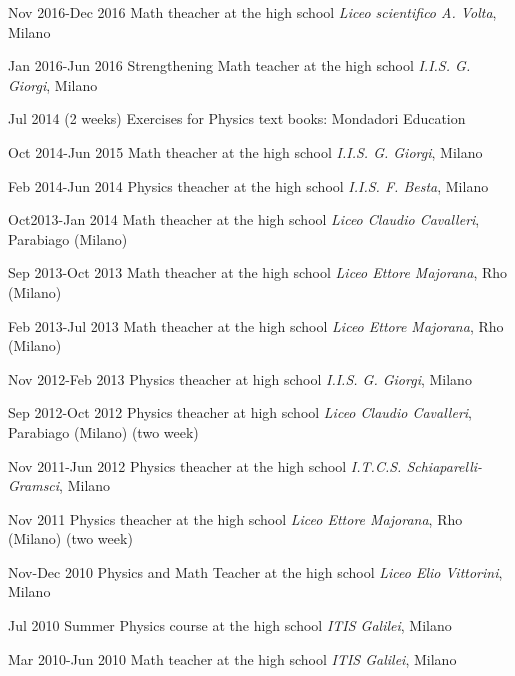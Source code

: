 \begin{CV}
	\item[Nov 2016-Dec 2016] Math theacher at the high school {\em Liceo scientifico A. Volta}, Milano
	
	\item[Jan 2016-Jun 2016] Strengthening Math teacher at the high school {\em I.I.S. G. Giorgi}, Milano
	
	\item[Jul 2014 (2 weeks)] Exercises for Physics text books: Mondadori Education
	
	\item[Oct 2014-Jun 2015] Math theacher at the high school {\em I.I.S. G. Giorgi}, Milano
	
	\item[Feb 2014-Jun 2014] Physics theacher at the high school {\em I.I.S. F. Besta}, Milano
	
	\item[Oct2013-Jan 2014] Math theacher at the high school {\em Liceo Claudio Cavalleri}, Parabiago (Milano)
	
	\item[Sep 2013-Oct 2013] Math theacher at the high school {\em Liceo Ettore Majorana}, Rho (Milano)
	
	\item[Feb 2013-Jul 2013] Math theacher at the high school {\em Liceo Ettore Majorana}, Rho (Milano)
	
	\item[Nov 2012-Feb 2013] Physics theacher at high school {\em I.I.S. G. Giorgi}, Milano
	
	\item[Sep 2012-Oct 2012] Physics theacher at high school {\em Liceo Claudio Cavalleri}, Parabiago (Milano) (two week)
	
	\item[Nov 2011-Jun 2012] Physics theacher at the high school {\em I.T.C.S. Schiaparelli-Gramsci}, Milano
	
	\item[Nov 2011] Physics theacher at the high school {\em Liceo Ettore Majorana}, Rho (Milano) (two week)
	
	\item[Nov-Dec 2010] Physics and Math Teacher at the high school {\em Liceo Elio Vittorini}, Milano
	
	\item[Jul 2010] Summer Physics course at the high school {\em ITIS Galilei}, Milano
	
	\item[Mar 2010-Jun 2010] Math teacher at the high school {\em ITIS Galilei}, Milano
	

\end{CV}
